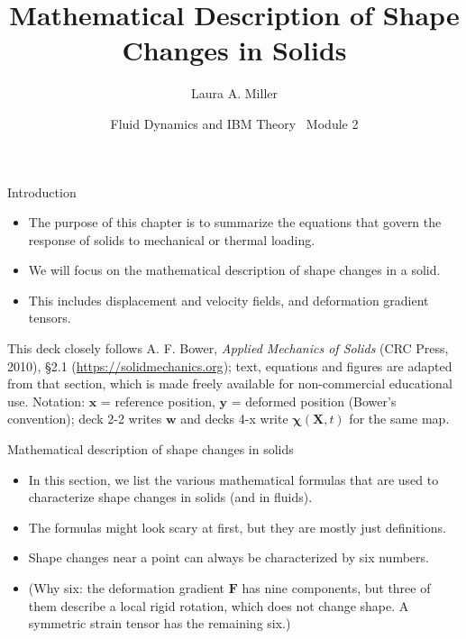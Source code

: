 \documentclass[aspectratio=169,11pt]{beamer}
\title{Mathematical Description of Shape Changes in Solids}
\author{Laura A. Miller}
\institute{Department of Mathematics, University of Arizona}
\date{Fluid Dynamics and IBM Theory \textbullet\ Module 2}
\begin{document}
\begin{frame}[plain,b]
\maketutorialtitle
\end{frame}

\begin{frame}{Introduction}
  \begin{itemize}
    \item   The purpose of this chapter is to summarize the equations that govern the response of solids to mechanical or thermal loading.
    \item   We will focus on the mathematical description of shape changes in a solid.
    \item   This includes displacement and velocity fields, and deformation gradient tensors.
  \end{itemize}
  \vspace{3mm}
  {\scriptsize\color{DarkGray}This deck closely follows A. F. Bower, \emph{Applied Mechanics of Solids} (CRC Press, 2010), \S2.1 (\url{https://solidmechanics.org}); text, equations and figures are adapted from that section, which is made freely available for non-commercial educational use. Notation: $\mathbf{x}$ = reference position, $\mathbf{y}$ = deformed position (Bower's convention); deck 2-2 writes $\mathbf{w}$ and decks 4-x write $\boldsymbol{\chi}(\mathbf{X},t)$ for the same map.\par}
\end{frame}

\begin{frame}{Mathematical description of shape changes in solids}
    \begin{itemize}
        \item   In this section, we list the various mathematical formulas that are used to characterize shape changes in solids (and in fluids).
        \item   The formulas might look scary at first, but they are mostly just definitions.
        \item   Shape changes near a point can always be characterized by six numbers.
        \item   (Why six: the deformation gradient $\mathbf{F}$ has nine components, but three of them describe a local rigid rotation, which does not change shape. A symmetric strain tensor has the remaining six.)
    \end{itemize}
\end{frame}
\end{document}
